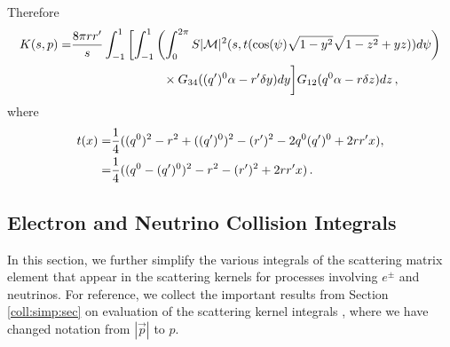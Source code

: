 Therefore 
\begin{align}
K(s,p)=&\frac{8\pi rr^{\prime}}{s}\int_{-1}^1 \left[\int_{-1}^1\left(\int_0^{2\pi} S |\mathcal{M}|^2 (s,t(\cos(\psi)\sqrt{1-y^2}\sqrt{1-z^2}+yz))d\psi\right)\right.\\
&\hspace{26mm}\times G_{34}((q^{\prime})^0\alpha-r^{\prime}\delta y) dy\bigg] G_{12}(q^0\alpha-r\delta z)dz\,,\notag
\end{align}
where
\begin{align}
t(x)=&\frac{1}{4}((q^0)^2-r^2+((q^{\prime})^0)^2-(r^{\prime})^2-2q^0(q^{\prime})^0+2rr^{\prime}x),\\
=&\frac{1}{4}((q^0-(q^{\prime})^0)^2-r^2-(r^{\prime})^2+2rr^{\prime}x)\,.\notag
\end{align}

\subsection{Electron and Neutrino Collision Integrals}\label{nu:matrix:elements}
In this section, we further simplify the various integrals of the scattering matrix element that appear in the scattering kernels for processes involving $e^\pm$ and neutrinos.  For reference, we collect the important results from Section \ref{coll:simp:sec} on evaluation of the scattering kernel integrals , where we have changed notation from $|\vec p|$ to $p$.

